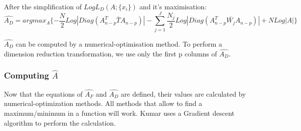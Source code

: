 After the simplification of $Log L_D(A; \{x_i\})$ and it's maximisation:
$$
\hat{A_D} = argmax_A\{-\frac{N}{2} Log|Diag(A_{n - p}^T \bar{T} A_{n - p})| - \sum\limits_{j = 1}^J \frac{N_j}{2} Log|Diag(A_{n - p}^T \bar{W_j} A_{n - p})| + N Log|A|\}
$$

$\hat{A_D}$ can be computed by a numerical-optimisation method.
To perform a dimension reduction transformation, we use only the first p columns of $\hat{A_D}$.

\subsubsection{Computing $\hat A$}

Now that the equations of $\hat{A_F}$ and $\hat{A_D}$ are defined, their values are calculated by numerical-optimization methods.
All methods that allow to find a maximum/minimum in a function will work.
Kumar\cite{kumar.1997} uses a Gradient descent algorithm to perform the calculation.
